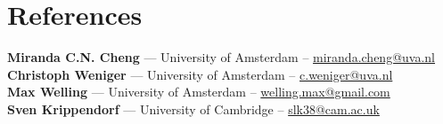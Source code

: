 \documentclass[11pt, letterpaper]{article}
\begin{document}






\section*{References}
\noindent
\textbf{Miranda C.N. Cheng} — University of Amsterdam -- \href{mailto:c.n.cheng@uva.nl}{miranda.cheng@uva.nl} \\
\textbf{Christoph Weniger} — University of Amsterdam  -- \href{mailto:c.weniger@uva.nl}{c.weniger@uva.nl} \\
\textbf{Max Welling} — University of Amsterdam -- \href{mailto:welling.max@gmail.com}{welling.max@gmail.com} \\
\textbf{Sven Krippendorf} — University of Cambridge -- \href{mailto:slk38@cam.ac.uk}{slk38@cam.ac.uk}
\end{document}
